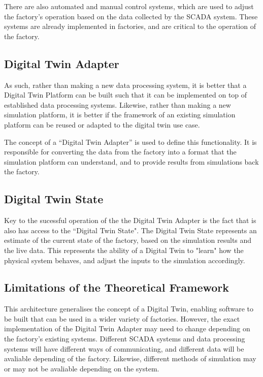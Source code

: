 There are also automated and manual control systems, which are used to adjust the factory's operation based on the data collected by the SCADA system.
These systems are already implemented in factories, and are critical to the operation of the factory.

\subsection{Digital Twin Adapter}

As such, rather than making a new data processing system, it is better that a Digital Twin Platform can be built such that it can be implemented on top of established data processing systems. Likewise, rather than making a new simulation platform, it is better if the framework of an existing simulation platform can be reused or adapted to the digital twin use case.

The concept of a ``Digital Twin Adapter'' is used to define this functionality. It is responsible for converting the data from the factory into a format that the simulation platform can understand, and to provide results from simulations back the factory.


\subsection{Digital Twin State}

Key to the sucessful operation of the the Digital Twin Adapter is the fact that is also has access to the ``Digital Twin State". The Digital Twin State represents an estimate of the current state of the factory, based on the simulation results and the live data. 
This represents the ability of a Digital Twin to "learn" how the physical system behaves, and adjust the inputs to the simulation accordingly.



\subsection{Limitations of the Theoretical Framework}

This architecture generalises the concept of a Digital Twin, enabling software to be built that can be used in a wider variety of factories. However, the exact implementation of the Digital Twin Adapter may need to change depending on the factory's existing systems. Different SCADA systems and data processing systems will have different ways of communicating, and different data will be avaliable depending of the factory. Likewise, different methods of simulation may or may not be avaliable depending on the system. 

